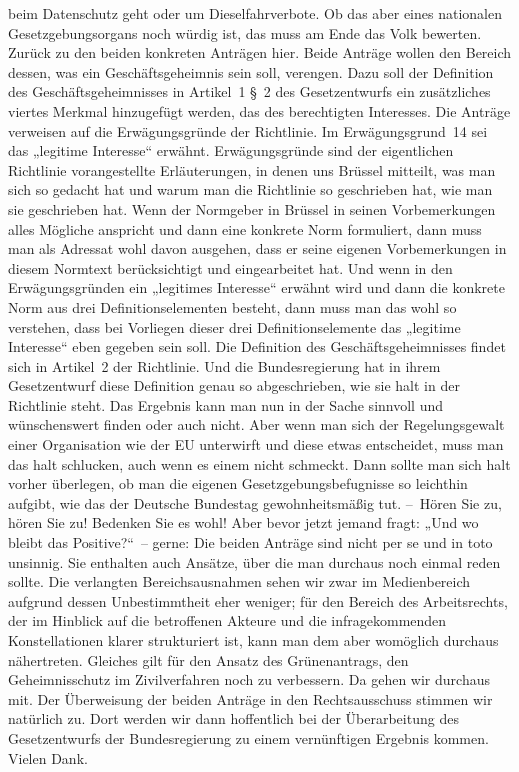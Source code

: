 \documentclass{article}
\begin{document}
beim Datenschutz geht oder um Dieselfahrverbote.  Ob das aber eines nationalen Gesetzgebungsorgans noch würdig ist, das muss am Ende das Volk bewerten.  Zurück zu den beiden konkreten Anträgen hier. Beide Anträge wollen den Bereich dessen, was ein Geschäftsgeheimnis sein soll, verengen.  Dazu soll der Definition des Geschäftsgeheimnisses in Artikel 1 § 2 des Gesetzentwurfs ein zusätzliches viertes Merkmal hinzugefügt werden, das des berechtigten Interesses. Die Anträge verweisen auf die Erwägungsgründe der Richtlinie. Im Erwägungsgrund 14 sei das „legitime Interesse“ erwähnt. Erwägungsgründe sind der eigentlichen Richtlinie vorangestellte Erläuterungen, in denen uns Brüssel mitteilt, was man sich so gedacht hat und warum man die Richtlinie so geschrieben hat, wie man sie geschrieben hat. Wenn der Normgeber in Brüssel in seinen Vorbemerkungen alles Mögliche anspricht und dann eine konkrete Norm formuliert, dann muss man als Adressat wohl davon ausgehen, dass er seine eigenen Vorbemerkungen in diesem Normtext berücksichtigt und eingearbeitet hat. Und wenn in den Erwägungsgründen ein „legitimes Interesse“ erwähnt wird und dann die konkrete Norm aus drei Definitionselementen besteht, dann muss man das wohl so verstehen, dass bei Vorliegen dieser drei Definitionselemente das „legitime Interesse“ eben gegeben sein soll. Die Definition des Geschäftsgeheimnisses findet sich in Artikel 2 der Richtlinie. Und die Bundesregierung hat in ihrem Gesetzentwurf diese Definition genau so abgeschrieben, wie sie halt in der Richtlinie steht. Das Ergebnis kann man nun in der Sache sinnvoll und wünschenswert finden oder auch nicht. Aber wenn man sich der Regelungsgewalt einer Organisation wie der EU unterwirft und diese etwas entscheidet, muss man das halt schlucken, auch wenn es einem nicht schmeckt. Dann sollte man sich halt vorher überlegen, ob man die eigenen Gesetzgebungsbefugnisse so leichthin aufgibt, wie das der Deutsche Bundestag gewohnheitsmäßig tut.  – Hören Sie zu, hören Sie zu! Bedenken Sie es wohl! Aber bevor jetzt jemand fragt: „Und wo bleibt das Positive?“ – gerne: Die beiden Anträge sind nicht per se und in toto unsinnig. Sie enthalten auch Ansätze, über die man durchaus noch einmal reden sollte.  Die verlangten Bereichsausnahmen sehen wir zwar im Medienbereich aufgrund dessen Unbestimmtheit eher weniger; für den Bereich des Arbeitsrechts, der im Hinblick auf die betroffenen Akteure und die infragekommenden Konstellationen klarer strukturiert ist, kann man dem aber womöglich durchaus nähertreten. Gleiches gilt für den Ansatz des Grünenantrags, den Geheimnisschutz im Zivilverfahren noch zu verbessern. Da gehen wir durchaus mit.  Der Überweisung der beiden Anträge in den Rechtsausschuss stimmen wir natürlich zu. Dort werden wir dann hoffentlich bei der Überarbeitung des Gesetzentwurfs der Bundesregierung zu einem vernünftigen Ergebnis kommen. Vielen Dank.  
\end{document}
